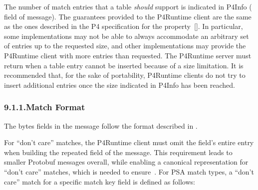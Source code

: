 \documentclass[11pt]{article}
\begin{document}
{%
The number of match entries that a table \emph{should} support is indicated in P4Info
( field of  message). The guarantees provided to the P4Runtime
client are the same as the ones described in the P4 specification for the
 property~[]. In particular, some implementations may
not be able to always accommodate an arbitrary set of entries up to the
requested size, and other implementations may provide the P4Runtime client with
more entries than requested. The P4Runtime server must return
 when a table entry cannot be inserted because of a size
limitation. It is recommended that, for the sake of portability, P4Runtime
clients do not try to insert additional entries once the size indicated in
P4Info has been reached.%

\subsubsection{9.1.1.\hspace*{0.5em}Match Format}\label{sec-match-format}%

\noindent{}The bytes fields in the  message follow the format described in
.%

For \textquotedblleft{}don't care\textquotedblright{} matches, the P4Runtime client must omit the field's entire
 entry when building the  repeated field of the 
message. This requirement leads to smaller Protobuf messages overall, while
enabling a canonical representation for \textquotedblleft{}don't care\textquotedblright{} matches, which is needed
to ensure~. For PSA match types,
a \textquotedblleft{}don't care\textquotedblright{} match for a specific match key field is defined as follows:%

}
\end{document}
